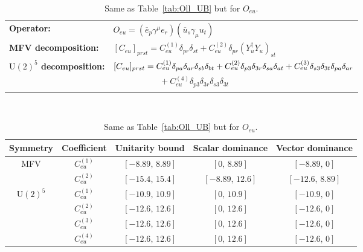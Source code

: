 \begin{table}[tbp]
\centering
{\small
\begin{tabular}{ll}
    \textbf{Operator:} &
        $\boxed{O_{eu} = (\overline e_p \gamma^\mu e_r)(\overline u_s \gamma_\mu u_t)}$ \\[0.2cm]
    \textbf{MFV decomposition:} &
        $[C_{eu}]_{prst} =
            C_{eu}^{(1)}\delta_{pr}\delta_{st}
            + C_{eu}^{(2)}\delta_{pr}(Y_u^\dagger Y_u)_{st}
            $ \\[0.15cm]
    \textbf{$\mathrm{U}(2)^5$ decomposition:} &
        $[C_{eu}]_{prst} =
            C_{eu}^{(1)}\Pij{p}{r}{a}\Pij{s}{t}{b}
            + C_{eu}^{(2)}\delta_{p3}\delta_{3r}\Pij{s}{t}{a} + C_{eu}^{(3)}\delta_{s3}\delta_{3t}\Pij{p}{r}{a}
            $ \\
        & $\phantom{[C_{eu}]_{prst} ={}}+ C_{eu}^{(4)}\delta_{p3}\delta_{3r}\delta_{s3}\delta_{3t}$ \\
\end{tabular}
\\[0.3cm]
\renewcommand{\arraystretch}{1.3}
\begin{tabular}{ccccc}
    \toprule
    \rowcolor{hdrcolor}
    \textbf{Symmetry} & \textbf{Coefficient}
        & \textbf{Unitarity bound}
        & \textbf{Scalar dominance}
        & \textbf{Vector dominance} \\
    \midrule
    \multirow{2}{*}{MFV}
        & $C_{eu}^{(1)}$ & $[-8.89,\, 8.89]$  & $[0,\, 8.89]$      & $[-8.89,\, 0]$    \\
        & $C_{eu}^{(2)}$ & $[-15.4,\, 15.4]$  & $[-8.89,\, 12.6]$  & $[-12.6,\, 8.89]$ \\
    \midrule
    \multirow{4}{*}{$\mathrm{U}(2)^5$}
        & $C_{eu}^{(1)}$ & $[-10.9,\, 10.9]$  & $[0,\, 10.9]$      & $[-10.9,\, 0]$    \\
        & $C_{eu}^{(2)}$ & $[-12.6,\, 12.6]$  & $[0,\, 12.6]$  & $[-12.6,\, 0]$ \\
        & $C_{eu}^{(3)}$ & $[-12.6,\, 12.6]$  & $[0,\, 12.6]$  & $[-12.6,\, 0]$ \\
        & $C_{eu}^{(4)}$ & $[-12.6,\, 12.6]$  & $[0,\, 12.6]$  & $[-12.6,\, 0]$ \\
    \bottomrule
\end{tabular}}
\caption{Same as Table~\ref{tab:Oll_UB} but for $O_{eu}$.}
\label{tab:Oeu_UB}
\end{table}

